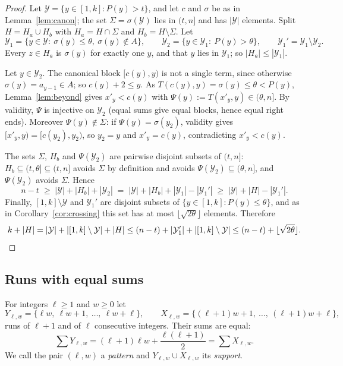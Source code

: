 \documentclass[11pt]{amsart}
\theoremstyle{remark}
\newcommand{\isqrt}[1]{\lfloor\sqrt{#1}\rfloor}
\begin{document}
\begin{proof}
Let $\mathcal Y=\{y\in[1,k]:P(y)>t\}$, and let $c$ and $\sigma$ be as in Lemma~\ref{lem:canon}; the set $\Sigma=\sigma(\mathcal Y)$ lies in $(t,n]$ and has
$|\mathcal Y|$ elements. Split $H=H_a\cup H_b$ with $H_a=H\cap\Sigma$ and $H_b=H\setminus\Sigma$. Let
\[
  \mathcal Y_1=\{y\in\mathcal Y:\ \sigma(y)\le\theta,\ \sigma(y)\notin A\},\qquad \mathcal Y_2=\{y\in \mathcal Y_1:\ P(y)>\theta\},\qquad \mathcal Y_1'=\mathcal Y_1\setminus \mathcal Y_2.
\]
Every $z\in H_a$ is $\sigma(y)$ for exactly one $y$, and that $y$ lies in $\mathcal Y_1$; so $|H_a|\le|\mathcal Y_1|$.

Let $y\in \mathcal Y_2$. The canonical block $[c(y),y)$ is not a single term, since otherwise $\sigma(y)=a_{y-1}\in A$; so $c(y)+2\le y$. As
$T(c(y),y)=\sigma(y)\le\theta<P(y)$, Lemma~\ref{lem:beyond} gives $x'_y<c(y)$ with $\Psi(y):=T(x'_y,y)\in(\theta,n]$. By validity, $\Psi$
is injective on $\mathcal Y_2$ (equal sums give equal blocks, hence equal right ends). Moreover $\Psi(y)\notin\Sigma$: if $\Psi(y)=\sigma(y_2)$,
validity gives $[x'_y,y)=[c(y_2),y_2)$, so $y_2=y$ and $x'_y=c(y)$, contradicting $x'_y<c(y)$.

The sets $\Sigma$, $H_b$ and $\Psi(\mathcal Y_2)$ are pairwise disjoint subsets of $(t,n]$: $H_b\subseteq(t,\theta]\subseteq(t,n]$ avoids $\Sigma$ by
definition and avoids $\Psi(\mathcal Y_2)\subseteq(\theta,n]$, and $\Psi(\mathcal Y_2)$ avoids $\Sigma$. Hence
\[
  n-t\;\ge\;|\mathcal Y|+|H_b|+|\mathcal Y_2|\;=\;|\mathcal Y|+|H_b|+|\mathcal Y_1|-|\mathcal Y_1'|\;\ge\;|\mathcal Y|+|H|-|\mathcal Y_1'|.
\]
Finally, $[1,k]\setminus\mathcal Y$ and $\mathcal Y_1'$ are disjoint subsets of $\{y\in[1,k]:P(y)\le\theta\}$, and as in Corollary~\ref{cor:crossing} this
set has at most $\isqrt{2\theta}$ elements. Therefore
\[
  k+|H|=|\mathcal Y|+|[1,k]\setminus\mathcal Y|+|H|\le(n-t)+|\mathcal Y_1'|+|[1,k]\setminus\mathcal Y|\le(n-t)+\isqrt{2\theta}.\qedhere
\]
\end{proof}

\subsection{Runs with equal sums}

For integers $\ell\ge1$ and $w\ge0$ let
\[
  Y_{\ell,w}=\{\ell w,\ \ell w+1,\ \dots,\ \ell w+\ell\},\qquad X_{\ell,w}=\{(\ell+1)w+1,\ \dots,\ (\ell+1)w+\ell\},
\]
runs of $\ell+1$ and of $\ell$ consecutive integers. Their sums are equal:
\[
  \textstyle\sum Y_{\ell,w}=(\ell+1)\ell w+\frac{\ell(\ell+1)}2=\sum X_{\ell,w}.
\]
We call the pair $(\ell,w)$ a \emph{pattern} and $Y_{\ell,w}\cup X_{\ell,w}$ its \emph{support}.
\end{document}
